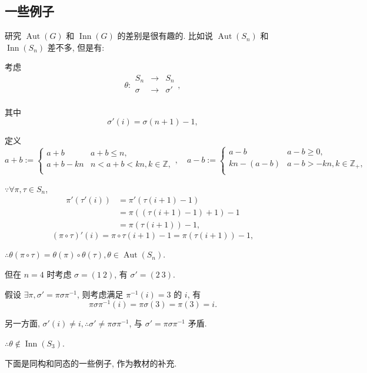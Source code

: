 \documentclass{ctexart}
\begin{document}
\subsection{一些例子}
研究 $\operatorname{Aut}(G)$ 和 $\operatorname{Inn}(G)$ 的差别是很有趣的. 比如说 $\operatorname{Aut}(S_n)$ 和 $\operatorname{Inn}(S_n)$ 差不多, 但是有:
\begin{example}%
    考虑
    \[\theta:\begin{array}{rcl}
        S_n & \to & S_n \\
        \sigma & \to & \sigma' \\
    \end{array},\]

    其中
    \[\sigma'(i)=\sigma(n+1)-1,\]

    定义
    \[a+b:=\begin{cases}
        a+b & a+b\leq n, \\
        a+b-kn & n<a+b<kn,k\in\mathbb{Z}, \\
    \end{cases},\quad a-b:=\begin{cases}
        a-b & a-b\geq 0, \\
        kn-(a-b) & a-b>-kn,k\in\mathbb{Z}_+, \\
    \end{cases}\]
    
    $\because\forall\pi,\tau\in S_n$,
    \begin{align*}
        \pi'(\tau'(i)) & =\pi'(\tau(i+1)-1) \\
        & =\pi((\tau(i+1)-1)+1)-1 \\
        & =\pi(\tau(i+1))-1,
    \end{align*}
    \[(\pi\circ\tau)'(i)=\pi\circ\tau(i+1)-1=\pi(\tau(i+1))-1,\]

    $\therefore\theta(\pi\circ\tau)=\theta(\pi)\circ\theta(\tau),\theta\in\operatorname{Aut}(S_n)$.

    但在 $n=4$ 时考虑 $\sigma=(1\ 2)$, 有 $\sigma'=(2\ 3)$.

    假设 $\exists\pi,\sigma'=\pi\sigma\pi^{-1}$, 则考虑满足 $\pi^{-1}(i)=3$ 的 $i$, 有
    \[\pi\sigma\pi^{-1}(i)=\pi\sigma(3)=\pi(3)=i.\]

    另一方面, $\sigma'(i)\neq i,\therefore\sigma'\neq\pi\sigma\pi^{-1}$, 与 $\sigma'=\pi\sigma\pi^{-1}$ 矛盾.

    $\therefore\theta\notin\operatorname{Inn}(S_3)$.
\end{example}
下面是同构和同态的一些例子, 作为教材的补充.
\end{document}

